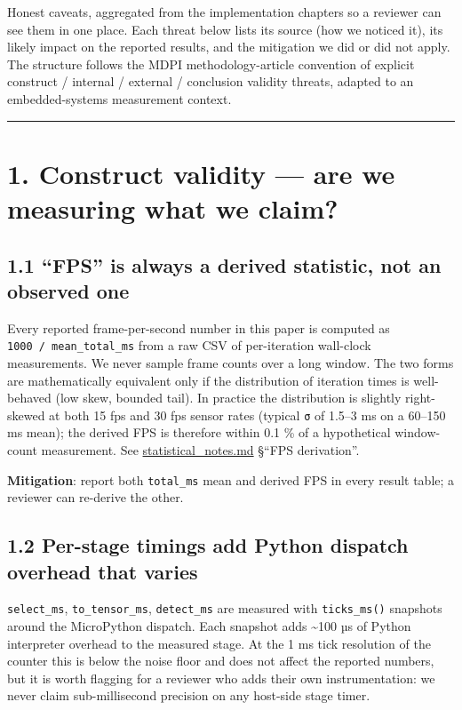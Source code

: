 Honest caveats, aggregated from the implementation chapters so a
reviewer can see them in one place. Each threat below lists its source
(how we noticed it), its likely impact on the reported results, and the
mitigation we did or did not apply. The structure follows the MDPI
methodology-article convention of explicit construct / internal /
external / conclusion validity threats, adapted to an embedded-systems
measurement context.

\begin{center}\rule{0.5\linewidth}{0.5pt}\end{center}

\section{1. Construct validity --- are we measuring what we
claim?}\label{construct-validity-are-we-measuring-what-we-claim}

\subsection{1.1 ``FPS'' is always a derived statistic, not an observed
one}\label{fps-is-always-a-derived-statistic-not-an-observed-one}

Every reported frame-per-second number in this paper is computed as
\texttt{1000\ /\ mean\_total\_ms} from a raw CSV of per-iteration
wall-clock measurements. We never sample frame counts over a long
window. The two forms are mathematically equivalent only if the
distribution of iteration times is well-behaved (low skew, bounded
tail). In practice the distribution is slightly right-skewed at both 15
fps and 30 fps sensor rates (typical \texttt{σ} of 1.5--3 ms on a
60--150 ms mean); the derived FPS is therefore within 0.1 \% of a
hypothetical window-count measurement. See \url{statistical_notes.md}
§``FPS derivation''.

\textbf{Mitigation}: report both \texttt{total\_ms} mean and derived FPS
in every result table; a reviewer can re-derive the other.

\subsection{1.2 Per-stage timings add Python dispatch overhead that
varies}\label{per-stage-timings-add-python-dispatch-overhead-that-varies}

\texttt{select\_ms}, \texttt{to\_tensor\_ms}, \texttt{detect\_ms} are
measured with \texttt{ticks\_ms()} snapshots around the MicroPython
dispatch. Each snapshot adds \textasciitilde100 µs of Python interpreter
overhead to the measured stage. At the 1 ms tick resolution of the
counter this is below the noise floor and does not affect the reported
numbers, but it is worth flagging for a reviewer who adds their own
instrumentation: we never claim sub-millisecond precision on any
host-side stage timer.

